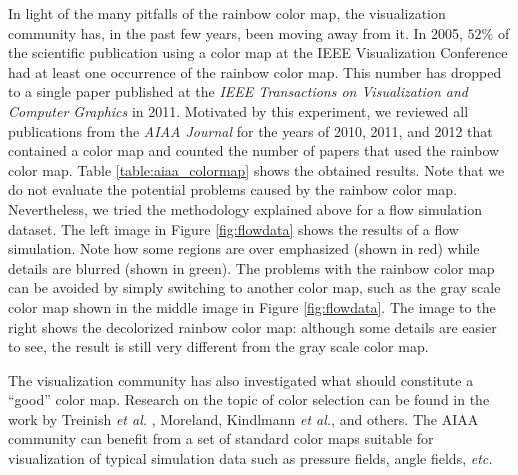 In light of the many pitfalls of the rainbow color map, the visualization community has, in the past few 
years, been moving away from it. 
%
In 2005, $52\%$ of the scientific publication using a color map at the IEEE Visualization Conference 
had at least one occurrence of the rainbow color map\cite{Borland:2007:RCM:1251554.1251614}. 
This number has dropped to a single paper published at the {\em IEEE Transactions on Visualization and 
Computer Graphics} in 2011. Motivated by this experiment, we reviewed all publications from the 
{\em AIAA Journal} for the years of 2010, 2011, and 2012 that contained a color map and counted the number of papers that used the rainbow color map. Table \ref{table:aiaa_colormap} shows the obtained results. Note that we do not evaluate the potential problems caused by the rainbow color map. 
%
Nevertheless, we tried the methodology explained above for a flow simulation dataset. 
The left image in Figure \ref{fig:flowdata} shows the results of a flow simulation. Note how some regions are over emphasized (shown in red) while details are blurred (shown in green). The problems with the rainbow color map can be avoided by simply switching to another color map, such as the gray scale color map shown in the middle image in Figure \ref{fig:flowdata}. The image to the right shows the decolorized rainbow color map: although some details are easier to see, the result is still very different from the gray scale color map.

The visualization community has also investigated what should constitute a ``good'' color map. Research on the topic of color selection can be found in the work by Treinish \emph{et al.} \cite{treinishshould}, Moreland\cite{paraview}, Kindlmann \emph{et al.}\cite{GLK:facelum02}, and others\cite{macdonald1999using,Tominski:2008bt}. The AIAA community can benefit from a set of standard color maps suitable for visualization of typical simulation data such as pressure fields, angle fields, {\em etc.}

